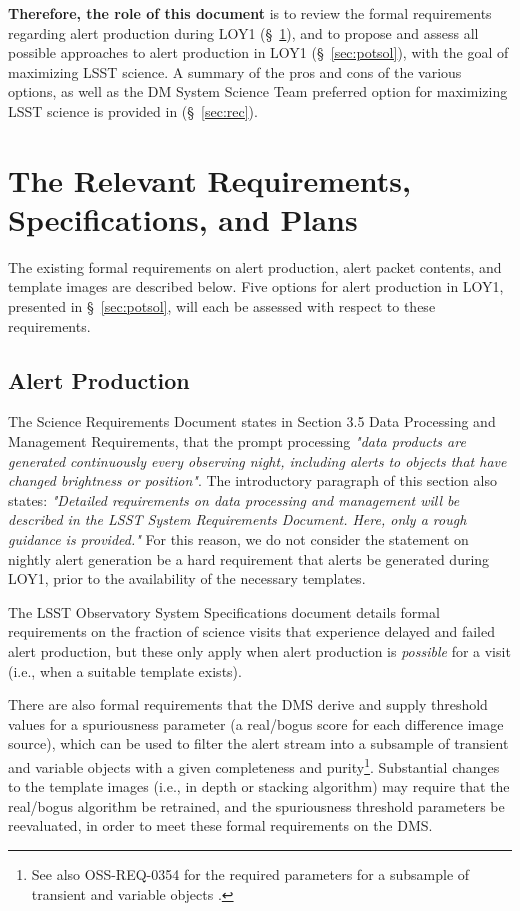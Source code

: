 \documentclass[DM,toc]{lsstdoc}
\begin{document}
{\bf Therefore, the role of this document} is to review the formal requirements regarding alert production during LOY1 (\S~\ref{sec:req}), and to propose and assess all possible approaches to alert production in LOY1 (\S~\ref{sec:potsol}), with the goal of maximizing LSST science. A summary of the pros and cons of the various options, as well as the DM System Science Team preferred option for maximizing LSST science is provided in (\S~\ref{sec:rec}).


\clearpage
\section{The Relevant Requirements, Specifications, and Plans}\label{sec:req}

The existing formal requirements on alert production, alert packet contents, and template images are described below.
Five options for alert production in LOY1, presented in \S~\ref{sec:potsol}, will each be assessed with respect to these requirements.

\subsection{Alert Production}\label{ssec:req_ap}

The Science Requirements Document  states in Section 3.5 Data Processing and Management Requirements, that the prompt processing {\it "data products are generated continuously every observing night, including alerts to objects that have changed brightness or position"}.
The introductory paragraph of this section also states: {\it "Detailed requirements on data processing and management will be described in the LSST System Requirements Document. Here, only a rough guidance is provided."} For this reason, we do not consider the  statement on nightly alert generation be a hard requirement that alerts be generated during LOY1, prior to the availability of the necessary templates.

The LSST Observatory System Specifications document  details formal requirements on the fraction of science visits that experience delayed and failed alert production, but these only apply when alert production is {\em possible} for a visit (i.e., when a suitable template exists).

There are also formal requirements that the DMS derive and supply threshold values for a spuriousness parameter (a real/bogus score for each difference image source), which can be used to filter the alert stream into a subsample of transient and variable objects with a given completeness and purity\footnote{See also OSS-REQ-0354 for the required parameters for a subsample of transient and variable objects .}.
Substantial changes to the template images (i.e., in depth or stacking algorithm) may require that the real/bogus algorithm be retrained, and the spuriousness threshold parameters be reevaluated, in order to meet these formal requirements on the DMS.
\end{document}

